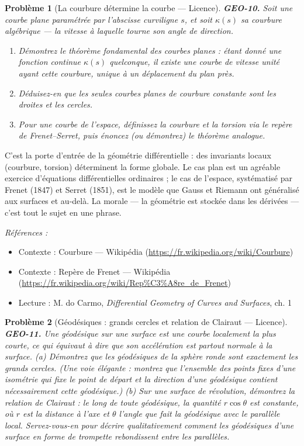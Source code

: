\documentclass[11pt]{article}
\newtheorem{problem}{Problème}
\newenvironment{refs}{\par\small\noindent\emph{Références :}\begin{itemize}\setlength\itemsep{0pt}}{\end{itemize}\normalsize}
\begin{document}
\begin{problem}[{La courbure détermine la courbe --- Licence}]
\textbf{GEO-10.} Soit une courbe plane paramétrée par l'abscisse curviligne $ s $, et soit
$ \kappa(s) $ sa courbure algébrique --- la vitesse à laquelle tourne son angle de direction.
\begin{enumerate}
\item[(a)] Démontrez le théorème fondamental des courbes planes : étant donné une fonction continue
$ \kappa(s) $ quelconque, il existe une courbe de vitesse unité ayant cette courbure, unique à
un déplacement du plan près.
\item[(b)] Déduisez-en que les seules courbes planes de courbure constante sont les droites et les
cercles.
\item[(c)] Pour une courbe de l'espace, définissez la courbure et la torsion via le repère de
Frenet--Serret, puis énoncez (ou démontrez) le théorème analogue.
\end{enumerate}

\end{problem}

\noindent C'est la porte d'entrée de la géométrie différentielle : des invariants locaux
(courbure, torsion) déterminent la forme globale. Le cas plan est un agréable exercice d'équations
différentielles ordinaires ; le cas de l'espace, systématisé par Frenet (1847) et Serret (1851),
est le modèle que Gauss et Riemann ont généralisé aux surfaces et au-delà. La morale --- la géométrie
est stockée dans les dérivées --- c'est tout le sujet en une phrase.

\begin{refs}
\item Contexte : Courbure --- Wikipédia (\url{https://fr.wikipedia.org/wiki/Courbure})
\item Contexte : Repère de Frenet --- Wikipédia (\url{https://fr.wikipedia.org/wiki/Rep%C3%A8re_de_Frenet})
\item Lecture : M. do Carmo, \textit{Differential Geometry of Curves and Surfaces}, ch. 1
\end{refs}

\bigskip

\begin{problem}[{Géodésiques : grands cercles et relation de Clairaut --- Licence}]
\textbf{GEO-11.} Une géodésique sur une surface est une courbe localement la
plus courte, ce qui équivaut à dire que son accélération est partout normale à la surface.
(a) Démontrez que les géodésiques de la sphère ronde sont exactement les grands cercles. (Une voie
élégante : montrez que l'ensemble des points fixes d'une isométrie qui fixe le point de départ et
la direction d'une géodésique contient nécessairement cette géodésique.) (b) Sur une surface de
révolution, démontrez la relation de Clairaut : le long de toute géodésique, la quantité
$ r \cos\theta $ est constante, où $ r $ est la distance à l'axe et $ \theta $ l'angle que
fait la géodésique avec le parallèle local. Servez-vous-en pour décrire qualitativement comment
les géodésiques d'une surface en forme de trompette rebondissent entre les parallèles.
\end{problem}
\end{document}
